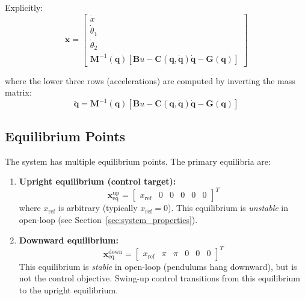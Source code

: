 Explicitly:
\begin{equation}
\dot{\mathbf{x}} = \begin{bmatrix}
\dot{x} \\
\dot{\theta}_1 \\
\dot{\theta}_2 \\
\mathbf{M}^{-1}(\mathbf{q})[\mathbf{B}u - \mathbf{C}(\mathbf{q}, \dot{\mathbf{q}})\dot{\mathbf{q}} - \mathbf{G}(\mathbf{q})]
\end{bmatrix}
\label{eq:state_space_explicit}
\end{equation}

where the lower three rows (accelerations) are computed by inverting the mass matrix:
\begin{equation}
\ddot{\mathbf{q}} = \mathbf{M}^{-1}(\mathbf{q})[\mathbf{B}u - \mathbf{C}(\mathbf{q}, \dot{\mathbf{q}})\dot{\mathbf{q}} - \mathbf{G}(\mathbf{q})]
\label{eq:acceleration}
\end{equation}

\subsection{Equilibrium Points}

The system has multiple equilibrium points. The primary equilibria are:

\begin{enumerate}
\item \textbf{Upright equilibrium (control target):}
\begin{equation}
\mathbf{x}_{\text{eq}}^{\text{up}} = \begin{bmatrix} x_{\text{ref}} & 0 & 0 & 0 & 0 & 0 \end{bmatrix}^T
\label{eq:upright_equilibrium}
\end{equation}
where $x_{\text{ref}}$ is arbitrary (typically $x_{\text{ref}} = 0$). This equilibrium is \textit{unstable} in open-loop (see Section~\ref{sec:system_properties}).

\item \textbf{Downward equilibrium:}
\begin{equation}
\mathbf{x}_{\text{eq}}^{\text{down}} = \begin{bmatrix} x_{\text{ref}} & \pi & \pi & 0 & 0 & 0 \end{bmatrix}^T
\label{eq:downward_equilibrium}
\end{equation}
This equilibrium is \textit{stable} in open-loop (pendulums hang downward), but is not the control objective. Swing-up control transitions from this equilibrium to the upright equilibrium.
\end{enumerate}

